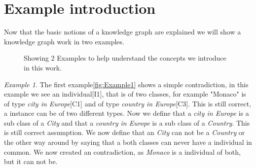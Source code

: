 \documentclass[11pt,letterpaper ,oneside ]{book}
\begin{document}
\section{Example introduction}
Now that the basic notions of a knowledge graph are explained we will show a knowledge graph work in two examples. 
\begin{figure}[ht]
	\centering
	\caption{Showing 2 Examples to help understand the concepts we introduce in this work.}
	\label{fig:Antipattern}
\end{figure}

\textit{Example 1}. The first example\ref{fig:Example1} shows a simple contradiction, in this example we see an individual[I1], that is of two classes, for example "Monaco" is of type \textit{city in Europe}[C1] and of type \textit{country in Europe}[C3]. This is still correct, a instance can be of two different types. Now we define that a \textit{city in Europe} is a sub class of a \textit{City} and that a \textit{country in Europe} is a sub class of a \textit{Country}. This is still correct assumption. We now define that an \textit{City} can not be a \textit{Country} or the other way around by saying that a both classes can never have a individual in common. We now created an contradiction, as \textit{Monaco} is a individual of both, but it can not be.\\
\end{document}
